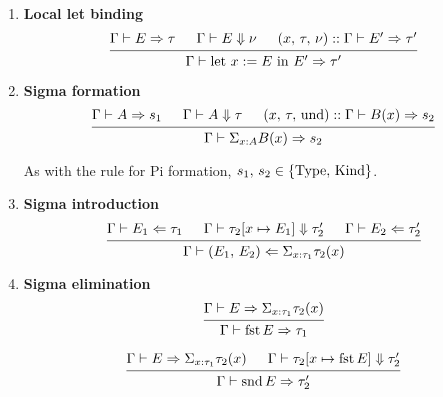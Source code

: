 \documentclass{article}
\begin{document}
\begin{definition} 
\begin{enumerate}
  \item \textbf{Local let binding} \\
    \[
      \begin{prooftree}
        \hypo{\Gamma \vdash E \Rightarrow \tau}
        \hypo{\Gamma \vdash E \Downarrow \nu}
        \hypo{(x, \, \tau, \, \nu) :: \Gamma \vdash E' \Rightarrow \tau'}
        \infer3{\Gamma \vdash \text{let } x := E \text{ in } E' \Rightarrow \tau'}
      \end{prooftree}
    \]

  \item \textbf{Sigma formation} \\
    \[
      \begin{prooftree}
        \hypo{\Gamma \vdash A \Rightarrow s_1}
        \hypo{\Gamma \vdash A \Downarrow \tau}
        \hypo{(x, \, \tau, \, \text{und}) :: \Gamma \vdash B(x) \Rightarrow s_2}
        \infer3{\Gamma \vdash \Sigma_{x : A}B(x) \Rightarrow s_2}
      \end{prooftree}
    \]

    As with the rule for Pi formation, $s_1, \, s_2 \in \{\operatorname{Type}, \, \operatorname{Kind}\}$.

  \item \textbf{Sigma introduction} \\
    \[
      \begin{prooftree}
        \hypo{\Gamma \vdash E_1 \Leftarrow \tau_1}
        \hypo{\Gamma \vdash \tau_2[x \mapsto E_1] \Downarrow \tau_2'}
        \hypo{\Gamma \vdash E_2 \Leftarrow \tau_2'}
        \infer3{\Gamma \vdash (E_1, \, E_2) \Leftarrow 
          \Sigma_{x : \tau_1}\tau_2(x)}
      \end{prooftree}
    \]
   
  \item \textbf{Sigma elimination} \\
    \[
      \begin{prooftree}
        \hypo{\Gamma \vdash E \Rightarrow \Sigma_{x : \tau_1}\tau_2(x)}
        \infer1{\Gamma \vdash \fst E \Rightarrow \tau_1}
      \end{prooftree}
    \]

    \[
      \begin{prooftree}
        \hypo{\Gamma \vdash E \Rightarrow \Sigma_{x : \tau_1}\tau_2(x)}
        \hypo{\Gamma \vdash \tau_2[x \mapsto \fst E] \Downarrow \tau_2'}
        \infer2{\Gamma \vdash \snd E \Rightarrow \tau_2'}
      \end{prooftree}
    \]


\end{enumerate}
\end{definition}
\end{document}
